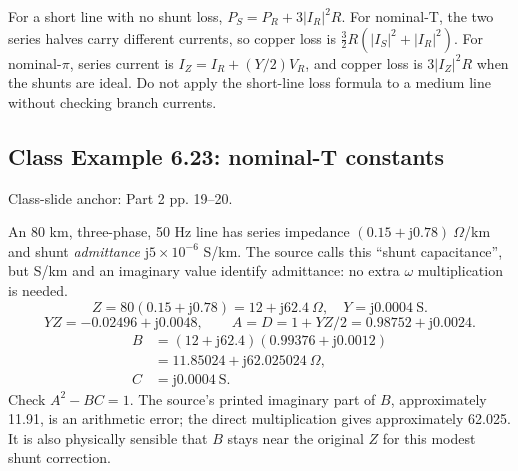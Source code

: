 \documentclass[11pt,a4paper]{article}
\newcommand{\slides}[1]{{\small\color{muted}\textsf{Class-slide anchor: #1.}}\par}
\newcommand{\ans}[1]{\boxed{#1}}
\newcommand{\jj}{\mathrm j}
\begin{document}
For a short line with no shunt loss, $P_S=P_R+3|I_R|^2R$. For nominal-T, the two series halves carry different currents, so copper loss is $\tfrac32R(|I_S|^2+|I_R|^2)$. For nominal-$\pi$, series current is $I_Z=I_R+(Y/2)V_R$, and copper loss is $3|I_Z|^2R$ when the shunts are ideal. Do not apply the short-line loss formula to a medium line without checking branch currents.
\subsection{Class Example 6.23: nominal-T constants}
\slides{Part 2 pp. 19--20}
An 80 km, three-phase, 50 Hz line has series impedance $(0.15+\jj0.78)\ \Omega$/km and shunt \emph{admittance} $\jj5\times10^{-6}$ S/km. The source calls this ``shunt capacitance'', but S/km and an imaginary value identify admittance: no extra $\omega$ multiplication is needed.
\[
 Z=80(0.15+\jj0.78)=12+\jj62.4\ \Omega,\quad
 Y=\jj0.0004\ \mathrm S.
\]
\[
 YZ=-0.02496+\jj0.0048,\qquad
 A=D=1+YZ/2=\ans{0.98752+\jj0.0024}.
\]
\[
 \begin{aligned}
 B&=(12+\jj62.4)(0.99376+\jj0.0012)\\
 &=\ans{11.85024+\jj62.025024\ \Omega},\\
 C&=\ans{\jj0.0004\ \mathrm S}.
 \end{aligned}
\]
Check $A^2-BC=1$. The source's printed imaginary part of $B$, approximately 11.91, is an arithmetic error; the direct multiplication gives approximately 62.025. It is also physically sensible that $B$ stays near the original $Z$ for this modest shunt correction.
\end{document}
